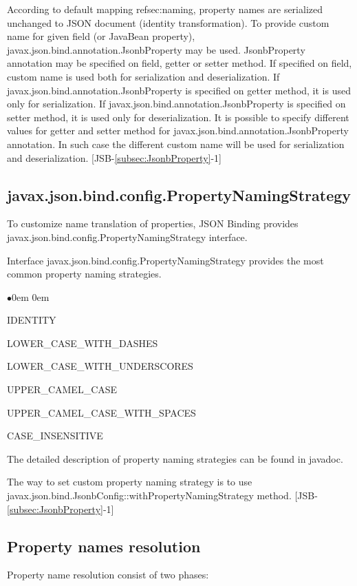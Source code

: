 According to default mapping ref{sec:naming}, property names are serialized unchanged to JSON document (identity transformation). To provide custom name for given field (or JavaBean property), javax.json.bind.annotation.JsonbProperty may be used. JsonbProperty annotation may be specified on field, getter or setter method. If specified on field, custom name is used both for serialization and deserialization. If javax.json.bind.annotation.JsonbProperty is specified on getter method, it is used only for serialization. If javax.json.bind.annotation.JsonbProperty is specified on setter method, it is used only for deserialization. It is possible to specify different values for getter and setter method for javax.json.bind.annotation.JsonbProperty annotation. In such case the different custom name will be used for serialization and deserialization. [JSB-\ref{subsec:JsonbProperty}-1]

\subsection{javax.json.bind.config.PropertyNamingStrategy}
\label{subsec:PropertyNamingStrategy}

To customize name translation of properties, JSON Binding provides javax.json.bind.config.PropertyNamingStrategy interface.

Interface javax.json.bind.config.PropertyNamingStrategy provides the most common property naming strategies.

\begin{list}{$\bullet$}{\parsep 0em  0em}
\item IDENTITY
\item LOWER\_CASE\_WITH\_DASHES
\item LOWER\_CASE\_WITH\_UNDERSCORES
\item UPPER\_CAMEL\_CASE
\item UPPER\_CAMEL\_CASE\_WITH\_SPACES
\item CASE\_INSENSITIVE
\end{list}

The detailed description of property naming strategies can be found in javadoc.

The way to set custom property naming strategy is to use javax.json.bind.JsonbConfig::withPropertyNamingStrategy method. [JSB-\ref{subsec:JsonbProperty}-1]

\subsection{Property names resolution}
\label{sec:property_names_resolution}
Property name resolution consist of two phases:

